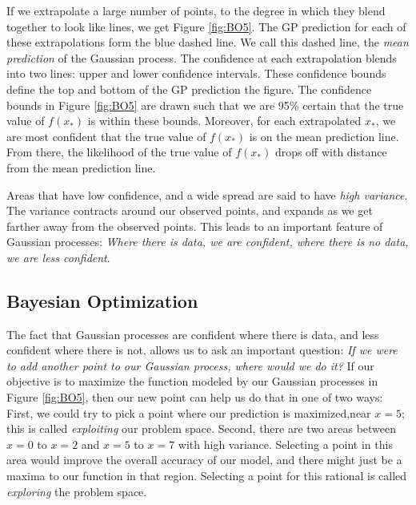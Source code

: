 \documentclass{sig-alternate}
\begin{document}
If we extrapolate a large number of points, to the degree in which they blend together to look like lines, we get Figure \ref{fig:BO5}.
The GP prediction for each of these extrapolations form the blue dashed line.
We call this dashed line, the \textit{mean prediction} of the Gaussian process.
The confidence at each extrapolation blends into two lines:
upper and lower confidence intervals.
These confidence bounds define the top and bottom of the GP prediction the figure.
The confidence bounds in Figure \ref{fig:BO5} are drawn such that we are 95\% certain that the true value of $f(x_{*})$ is within these bounds.
Moreover, for each extrapolated $x_{*}$, we are most confident that the true value of $f(x_{*})$ is on the mean prediction line.
From there, the likelihood of the true value of $f(x_{*})$ drops off with distance from the mean prediction line.

Areas that have low confidence, and a wide spread are said to have \textit{high variance}.
The variance contracts around our observed points, and expands as we get farther away from the observed points.
This leads to an important feature of Gaussian processes:
\textit{Where there is data, we are confident, where there is no data, we are less confident}.

\subsection{Bayesian Optimization}
\label{bayesianOptimization}

The fact that Gaussian processes are confident where there is data, and less confident where there is not, allows us to ask an important question:
\textit{If we were to add another point to our Gaussian process, where would we do it?}
If our objective is to maximize the function modeled by our Gaussian processes in Figure \ref{fig:BO5}, then our new point can help us do that in one of two ways:
First, we could try to pick a point where our prediction is maximized,near $x=5$; this is called \textit{exploiting} our problem space.
Second, there are two areas between $x=0$ to $x=2$ and $x=5$ to $x=7$ with high variance.
Selecting a point in this area would improve the overall accuracy of our model, and there might just be a maxima to our function in that region.
Selecting a point for this rational is called \textit{exploring} the problem space.

\begin{figure}[htb]
\centering
{}
\label{fig:t4}
\end{figure}
\end{document}
